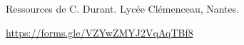 Ressources de C. Durant. Lycée Clémenceau, Nantes.
\begin{center}
\end{center}

\url{https://forms.gle/VZYwZMYJ2VqAqTBf8}